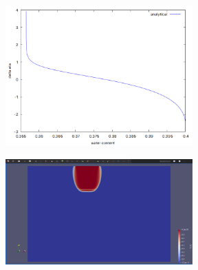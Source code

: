 \begin{frame}
	\frametitle{\secname}
	\begin{minipage}{0.5\textwidth}
		\begin{figure}[ht!]
			\centering
			\includegraphics[width=7.2cm]{infiltration_theta_vs_deltaeta}
		\end{figure}
	\end{minipage}
	\begin{minipage}{0.3\textwidth}
		\begin{figure}[ht!]
			\centering
			\includegraphics[width=7.2cm]{richard_lens}
		\end{figure}
	\end{minipage}
\end{frame}

